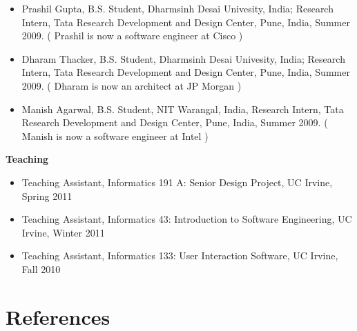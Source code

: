 \documentclass[letterpaper,11pt]{article}
\begin{document}
\begin{itemize}
\vspace{-5pt}\item\small{Prashil Gupta, B.S. Student, Dharmsinh Desai Univesity, India;  Research Intern, Tata Research Development and Design Center, Pune, India, Summer 2009. ( Prashil is now a software engineer at Cisco )} \\
\vspace{-5pt}\item\small{Dharam Thacker, B.S. Student, Dharmsinh Desai Univesity, India;  Research Intern, Tata Research Development and Design Center, Pune, India, Summer 2009. ( Dharam is now an architect at JP Morgan ) }\\
\vspace{-5pt}\item\small{Manish Agarwal, B.S. Student, NIT Warangal, India, Research Intern, Tata Research Development and Design Center, Pune, India, Summer 2009. ( Manish is now a software engineer at Intel )} \\

\end{itemize}

\textbf{Teaching}

\begin{itemize}

\vspace{-5pt}\item\small{Teaching Assistant, Informatics 191 A: Senior Design Project, UC Irvine, Spring 2011} \\
\vspace{-5pt}\item\small{Teaching Assistant, Informatics 43: Introduction to Software Engineering, UC Irvine, Winter 2011} \\
\vspace{-5pt}\item\small{Teaching Assistant, Informatics 133: User Interaction Software, UC Irvine, Fall 2010} 

\end{itemize}

\section{References}
\end{document}
